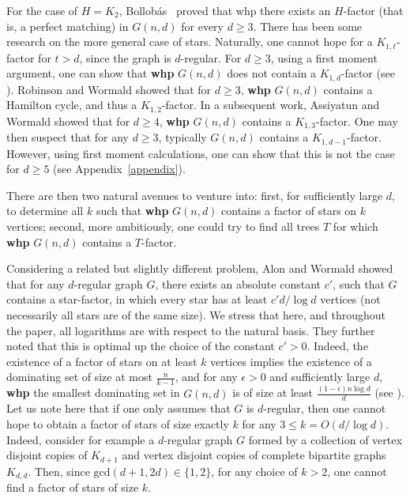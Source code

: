 \documentclass[notitlepage]{scrartcl}
\begin{document}
For the case of $H=K_2$, Bollob\'as~\cite{B81} proved that whp there exists an $H$-factor (that is, a perfect matching) in $G(n, d)$ for every $d \ge 3$.
There has been some research on the more general case of stars. Naturally, one cannot hope for a $K_{1,t}$-factor for $t>d$, since the graph is $d$-regular. For $d\ge 3$, using a first moment argument, one can show that \textbf{whp} $G(n,d)$ does not contain a $K_{1,d}$-factor (see \cite[Corollary 2]{assiyatun20063}). Robinson and Wormald \cite{robinson1994almost} showed that for $d\ge 3$, \textbf{whp} $G(n,d)$ contains a Hamilton cycle, and thus a $K_{1,2}$-factor. In a subsequent work, Assiyatun and Wormald \cite{assiyatun20063} showed that for $d\ge 4$, \textbf{whp} $G(n,d)$ contains a $K_{1,3}$-factor. One may then suspect that for any $d\ge 3$, typically $G(n,d)$ contains a $K_{1,d-1}$-factor. However, using first moment calculations, one can show that this is not the case for $d\ge 5$ (see Appendix~\ref{appendix}).

There are then two natural avenues to venture into: first, for sufficiently large $d$, to determine all $k$ such that \textbf{whp} $G(n,d)$ contains a factor of stars on $k$ vertices; second, more ambitiously, one could try to find all trees $T$ for which \textbf{whp} $G(n, d)$ contains a $T$-factor.

Considering a related but slightly different problem, Alon and Wormald \cite{alon2010high} showed that for any $d$-regular graph $G$, there exists an absolute constant $c'$, such that $G$ contains a star-factor, in which every star has at least $c'd/\log d$ vertices (not necessarily all stars are of the same size). We stress that here, and throughout the paper, all logarithms are with respect to the natural basis. They further noted that this is optimal up the choice of the constant $c'>0$. Indeed, the existence of a factor of stars on at least $k$ vertices implies the existence of a dominating set of size at most $\frac{n}{k-1}$, and for any $\epsilon>0$ and sufficiently large $d$, \textbf{whp} the smallest dominating set in $G(n,d)$ is of size at least $\frac{(1-\epsilon)n\log d}{d}$ (see \cite[page 3]{alon2010high}). Let us note here that if one only assumes that $G$ is $d$-regular, then one cannot hope to obtain a factor of stars of size exactly $k$ for any $3\leq k=O(d/\log d)$. Indeed, consider for example a $d$-regular graph $G$ formed by a collection of vertex disjoint copies of $K_{d+1}$ and vertex disjoint copies of complete bipartite graphs $K_{d,d}$. Then, since $\text{gcd}(d+1,2d)\in \{1,2\}$, for any choice of $k>2$, one cannot find a factor of stars of size $k$.
\end{document}
